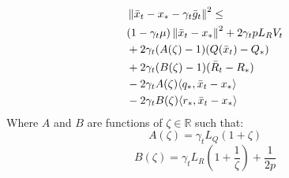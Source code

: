 \begin{lemma}\label{lem:AB-lemma}
    \begin{align}
    \begin{split}
        &\left\|\bar{x}_t - x_* - \gamma_{t} \bar{g}_t\right\|^2 \leq \\
        &(1 - \gamma_{t} \mu)\left\|\bar{x}_t - x_*\right\|^2 + 2 \gamma_{t} p L_R V_t \\
        &+ 2\gamma_{t} (A(\zeta) - 1)(Q(\bar{x}_t) - Q_*) \\
        &+ 2\gamma_{t} (B(\zeta) - 1)(\bar{R}_t - R_*) \\
        &- 2\gamma_{t} A(\zeta) \langle q_*, \bar{x}_t - x_*\rangle \\
        &- 2\gamma_{t} B(\zeta) \langle r_*, \bar{x}_t - x_*\rangle
    \end{split}
\end{align}
Where $A$ and $B$ are functions of $\zeta \in \mathbb{R}$ such that:
\[A(\zeta) = \gamma_{t} L_Q(1+\zeta)\] 
\[B(\zeta) = \gamma_{t} L_R(1+\frac{1}{\zeta}) + \frac{1}{2p}\]

\end{lemma}
